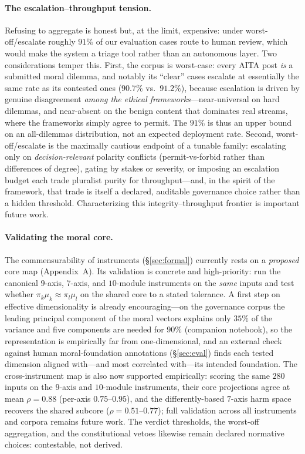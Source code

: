 \paragraph{The escalation--throughput tension.} Refusing to aggregate is honest but, at the
limit, expensive: under worst-off/escalate roughly $91\%$ of our evaluation cases route to
human review, which would make the system a triage tool rather than an autonomous layer. Two
considerations temper this. First, the corpus is worst-case: every AITA post \emph{is} a
submitted moral dilemma, and notably its ``clear'' cases escalate at essentially the same rate
as its contested ones ($90.7\%$ vs.\ $91.2\%$), because escalation is driven by genuine
disagreement \emph{among the ethical frameworks}---near-universal on hard dilemmas, and
near-absent on the benign content that dominates real streams, where the frameworks simply
agree to permit. The $91\%$ is thus an upper bound on an all-dilemmas distribution, not an
expected deployment rate. Second, worst-off/escalate is the maximally cautious endpoint of a
tunable family: escalating only on \emph{decision-relevant} polarity conflicts (permit-vs-forbid
rather than differences of degree), gating by stakes or severity, or imposing an escalation
budget each trade pluralist purity for throughput---and, in the spirit of the framework, that
trade is itself a declared, auditable governance choice rather than a hidden threshold.
Characterizing this integrity--throughput frontier is important future work.

\paragraph{Validating the moral core.} The commensurability of instruments
(\S\ref{sec:formal}) currently rests on a \emph{proposed} core map (Appendix~A). Its
validation is concrete and high-priority: run the canonical $9$-axis, $7$-axis, and
$10$-module instruments on the \emph{same} inputs and test whether
$\pi_k\mu_k\approx\pi_l\mu_l$ on the shared core to a stated tolerance. A first step on
effective dimensionality is already encouraging---on the governance corpus the leading
principal component of the moral vectors explains only $35\%$ of the variance and five
components are needed for $90\%$ (companion notebook), so the representation is empirically far
from one-dimensional, and an external check against human moral-foundation annotations
(\S\ref{sec:eval}) finds each tested dimension aligned with---and most correlated with---its
intended foundation. The cross-instrument map is also now supported empirically: scoring the
same $280$ inputs on the $9$-axis and $10$-module instruments, their core projections agree at
mean $\rho=0.88$ (per-axis $0.75$--$0.95$), and the differently-based $7$-axis harm space
recovers the shared subcore ($\rho=0.51$--$0.77$); full validation across all instruments and
corpora remains future work. The verdict thresholds, the worst-off aggregation, and the
constitutional vetoes likewise remain declared normative choices: contestable, not derived.

